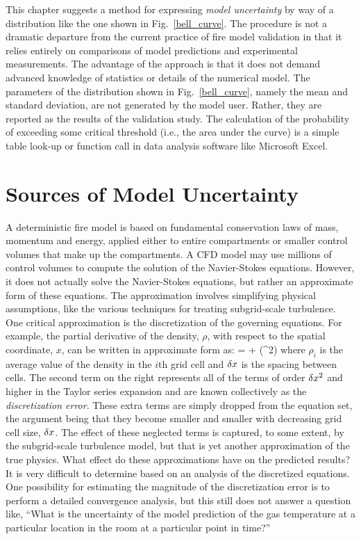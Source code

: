 This chapter suggests a method for expressing {\em model uncertainty} by way of a distribution like the one shown in Fig.~\ref{bell_curve}. The
procedure is not a dramatic departure from the current practice of fire model validation in that it relies entirely on comparisons of model
predictions and experimental measurements. The advantage of the approach is that it does not demand advanced knowledge of statistics or details of
the numerical model. The parameters of the distribution shown in Fig.~\ref{bell_curve}, namely the mean and standard deviation, are not generated by
the model user. Rather, they are reported as the results of the validation study. The calculation of the probability of exceeding some critical
threshold (i.e., the area under the curve) is a simple table look-up or function call in data analysis software like Microsoft
Excel\textregistered.



\section{Sources of Model Uncertainty}

A deterministic fire model is based on fundamental conservation laws of mass, momentum and energy,
applied either to entire compartments or smaller control
volumes that make up the compartments. A CFD model may use millions of control volumes to compute the
solution of the Navier-Stokes equations.
However, it does not actually solve the Navier-Stokes equations, but rather an approximate form of these equations.
The approximation involves simplifying
physical assumptions, like the various techniques for treating subgrid-scale turbulence.
One critical approximation is the discretization of the governing equations. For example,
the partial derivative of the density, $\rho$,
with respect to the spatial coordinate, $x$, can be written in approximate form as:
\be {} =  + (\dx^2) \ee
where $\rho_i$ is the average value of the density in the $i$th grid cell and $\delta x$ is the spacing between cells.
The second term on the right represents all of the terms of order $\delta x^2$ and higher in the Taylor
series expansion and are known collectively as the
{\em discretization error}. These extra terms are simply dropped from
the equation set, the argument being that they become smaller and smaller with decreasing grid cell size, $\delta x$.
The effect of these neglected terms is captured, to
some extent, by the subgrid-scale turbulence model, but that is yet another approximation of the true physics.
What effect do these approximations have on
the predicted results? It is very difficult to determine based on an analysis of the discretized equations.
One possibility for estimating
the magnitude of the discretization error is to perform a detailed
convergence analysis, but this still does not answer a
question like, ``What is the uncertainty of the model prediction of the gas
temperature at a particular location in the room at a particular point in time?''

